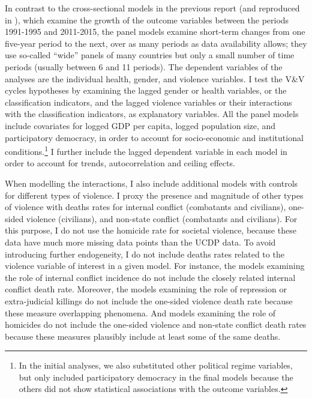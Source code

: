 \documentclass[12pt]{article}
\begin{document}
In contrast to the cross-sectional models in the previous report (and reproduced in ), which examine the growth of the outcome variables between the periods 1991-1995 and 2011-2015, the panel models examine short-term changes from one five-year period to the next, over as many periods as data availability allows; they use so-called \enquote{wide} panels of many countries but only a small number of time periods (usually between 6 and 11 periods).
The dependent variables of the analyses are the individual health, gender, and violence variables.
I test the V\&V cycles hypotheses by examining the lagged gender or health variables, or the classification indicators, and the lagged violence variables or their interactions with the classification indicators, as explanatory variables.
All the panel models include covariates for logged GDP per capita, logged population size, and participatory democracy, in order to account for socio-economic and institutional conditions.\footnote{In the initial analyses, we also substituted other political regime variables, but only included participatory democracy in the final models because the others did not show statistical associations with the outcome variables.}
I further include the lagged dependent variable in each model in order to account for trends, autocorrelation and ceiling effects.

When modelling the interactions, I also include additional models with controls for different types of violence.
I proxy the presence and magnitude of other types of violence with deaths rates for internal conflict (combatants and civilians), one-sided violence (civilians), and non-state conflict (combatants and civilians). For this purpose, I do not use the homicide rate for societal violence, because these data have much more missing data points than the UCDP data.
To avoid introducing further endogeneity, I do not include deaths rates related to the violence variable of interest in a given model.
For instance, the models examining the role of internal conflict incidence do not include the closely related internal conflict death rate. Moreover, the models examining the role of repression or extra-judicial killings do not include the one-sided violence death rate because these measure overlapping phenomena. And models examining the role of homicides do not include the one-sided violence and non-state conflict death rates because these measures plausibly include at least some of the same deaths.
\end{document}
